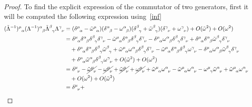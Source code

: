     \begin{proof}
        To find the explicit expression of the commutator of two generators, first it will be computed the following expression using~\eqref{inf}
        \begin{equation*}
        \begin{aligned}
            (\tilde \Lambda^{-1})^{\mu}_{\phantom \mu \alpha} (\Lambda^{-1})^{\alpha}_{\phantom \alpha \beta} \tilde \Lambda^{\beta}_{\phantom \beta \gamma} \Lambda^{\gamma}_{\phantom \gamma \nu} & = (\delta^{\mu}_{\phantom \mu \alpha} - \tilde \omega^{\mu}_{\phantom \mu \alpha})(\delta^{\alpha}_{\phantom \alpha \beta} - \omega^{\alpha}_{\phantom \alpha \beta})(\delta^{\beta}_{\phantom \beta \gamma} + \tilde \omega^{\beta}_{\phantom \beta \gamma})(\delta^{\gamma}_{\phantom \gamma \nu} + \omega^{\gamma}_{\phantom \gamma \nu}) + O(\tilde \omega^2) + O(\omega^2) \\ & = \delta^{\mu}_{\phantom \mu \alpha} \delta^{\alpha}_{\phantom \alpha \beta} \delta^{\beta}_{\phantom \beta \gamma} \delta^{\gamma}_{\phantom \gamma \nu} - \tilde \omega^{\mu}_{\phantom \mu \alpha} \delta^{\alpha}_{\phantom \alpha \beta} \delta^{\beta}_{\phantom \beta \gamma} \delta^{\gamma}_{\phantom \gamma \nu} - \delta^{\mu}_{\phantom \mu \alpha} \omega^{\alpha}_{\phantom \alpha \beta}\delta^{\beta}_{\phantom \beta \gamma}\delta^{\gamma}_{\phantom \gamma \nu} + \delta^{\mu}_{\phantom \mu \alpha} \delta^{\alpha}_{\phantom \alpha \beta} \tilde \omega^{\beta}_{\phantom \beta \gamma}\delta^{\gamma}_{\phantom \gamma \nu} \\ & \quad + \delta^{\mu}_{\phantom \mu \alpha} \delta^{\alpha}_{\phantom \alpha \beta} \delta^{\beta}_{\phantom \beta \gamma} \tilde \omega^{\beta}_{\phantom \beta \gamma} + \tilde \omega^{\mu}_{\phantom \mu \alpha} \omega^{\alpha}_{\phantom \alpha \beta} \delta^{\beta}_{\phantom \beta \gamma} \delta^{\gamma}_{\phantom \gamma \nu} - \tilde \omega^{\mu}_{\phantom \mu \alpha} \delta^{\alpha}_{\phantom \alpha \beta} \delta^{\beta}_{\phantom \beta \gamma} \omega^{\gamma}_{\phantom \gamma \nu} - \delta^{\mu}_{\phantom \mu \alpha} \omega^{\alpha}_{\phantom \alpha \beta} \tilde \omega^{\beta}_{\phantom \beta \gamma} \delta^{\gamma}_{\phantom \gamma \nu} \\ & \quad + \delta^{\mu}_{\phantom \mu \alpha} \tilde \omega^{\alpha}_{\phantom \alpha \beta} \delta^{\beta}_{\phantom \beta \gamma} \omega^{\gamma}_{\phantom \gamma \nu} + O(\tilde \omega^2) + O(\omega^2) \\ & = \delta^{\mu}_{\phantom \mu \nu} - \cancel{\tilde \omega^{\mu}_{\phantom \mu \nu}} - \cancel{\omega^{\mu}_{\phantom \mu \nu}} + \cancel{\tilde \omega^{\mu}_{\phantom \mu \nu}} + \cancel{\omega^{\mu}_{\phantom \mu \nu}} + \tilde \omega^{\mu}_{\phantom \mu \alpha} \omega^{\alpha}_{\phantom \alpha \nu} - \tilde \omega^{\mu}_{\phantom \mu \alpha} \omega^{\alpha}_{\phantom \alpha \nu} - \omega^{\mu}_{\phantom \mu \gamma} \tilde \omega^{\alpha}_{\phantom \alpha \nu} + \tilde \omega^{\mu}_{\phantom \mu \alpha} \omega^{\alpha}_{\phantom \alpha \nu} \\ & \quad + O(\omega^2) + O(\tilde \omega^2) \\ & = \delta^{\mu}_{\phantom \mu \nu} + 
\end{aligned}
\end{equation*}
\end{proof}
